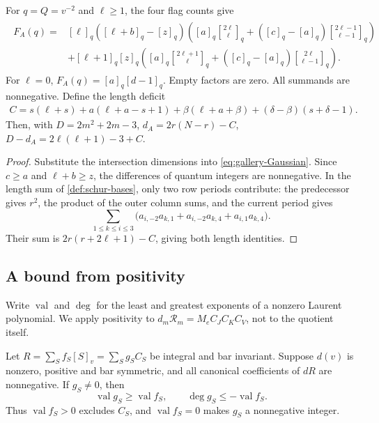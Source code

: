 \documentclass[a4paper,11pt]{amsart}
\numberwithin{equation}{subsection}
\theoremstyle{plain}
\theoremstyle{definition}
\theoremstyle{remark}
\newcommand{\qbinom}[2]{\genfrac{[}{]}{0pt}{}{#1}{#2}}
\begin{document}
\begin{lemma}\label{lem:gallery-degrees}
For $q=Q=v^{-2}$ and $\ell\ge1$, the four flag counts give
\begin{gather}\label{eq:relevance-four-terms}
\begin{aligned}
F_A(q)={}&[\ell]_q([\ell+b]_q-[z]_q)
\left([a]_q\qbinom{2\ell}{\ell}_q+
([c]_q-[a]_q)\qbinom{2\ell-1}{\ell-1}_q\right)\\
&+[\ell+1]_q[z]_q
\left([a]_q\qbinom{2\ell+1}{\ell}_q+
([c]_q-[a]_q)\qbinom{2\ell}{\ell-1}_q\right).
\end{aligned}
\end{gather}
For $\ell=0$, $F_A(q)=[a]_q[d-1]_q$. Empty factors are zero.
All summands are nonnegative. Define the length deficit
\begin{gather*}
C=s(\ell+s)+a(\ell+a-s+1)+\beta(\ell+a+\beta)
+(\delta-\beta)(s+\delta-1).
\end{gather*}
Then, with $D=2m^2+2m-3$,
$d_A=2r(N-r)-C$, $D-d_A=2\ell(\ell+1)-3+C$.
\end{lemma}

\begin{proof}
Substitute the intersection dimensions into
\autoref{eq:gallery-Gaussian}. Since $c\ge a$ and $\ell+b\ge z$,
the differences of quantum integers are nonnegative.
In the length sum of \autoref{def:schur-bases}, only two row periods
contribute: the predecessor gives $r^2$, the product of the outer
column sums, and the current period gives
\[
\sum_{1\le k\le i\le3}
\bigl(a_{i,-2}a_{k,1}+a_{i,-2}a_{k,4}+a_{i,1}a_{k,4}\bigr).
\]
Their sum is $2r(r+2\ell+1)-C$, giving both length identities.
\end{proof}

\subsection{A bound from positivity}

Write $\operatorname{val}$ and $\deg$ for the least and greatest
exponents of a nonzero Laurent polynomial. We apply positivity
to $d_m\mathcal R_m=M_eC_JC_KC_V$, not to the quotient itself.

\begin{lemma}\label{lem:undivided-positivity-degree}
Let $R=\sum_S f_S[S]_v=\sum_S g_SC_S$ be integral and bar invariant.
Suppose $d(v)$ is nonzero, positive and bar symmetric, and all
canonical coefficients of $dR$ are nonnegative. If $g_S\ne0$, then
\[
\operatorname{val}g_S\ge\operatorname{val}f_S,\qquad
\deg g_S\le-\operatorname{val}f_S.
\]
Thus $\operatorname{val}f_S>0$ excludes $C_S$, and
$\operatorname{val}f_S=0$ makes $g_S$ a nonnegative integer.
\end{lemma}
\end{document}
